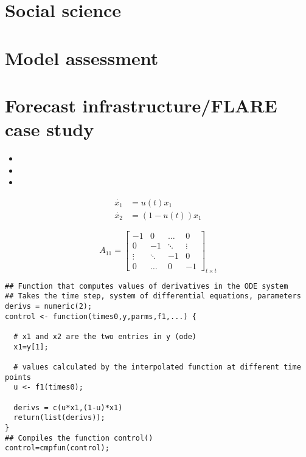 \documentclass[12pt, oneside]{article}   	%
\begin{document}
\section{Social science}

\section{Model assessment}

\section{Forecast infrastructure/FLARE case study}


\begin{itemize}
\item 

\item 

\item 

\end{itemize}

\begin{align}
\dot{x_1} & = u(t) x_1 \nonumber \\
\dot{x_2} & = (1-u(t)) x_1 
\end{align}

\begin{equation}
A_{11}=
  \begin{bmatrix}
    -1		& 0 	 	& \ldots 	& 0  	 \\
    0 	 	& -1  	& \ddots 	& \vdots  \\
    \vdots   & \ddots 	& -1		& 0  \\
    0 		& \ldots 	& 0 		& -1  
  \end{bmatrix}_{ t \times t}
\end{equation}

\begin{lstlisting}
## Function that computes values of derivatives in the ODE system
## Takes the time step, system of differential equations, parameters
derivs = numeric(2); 
control <- function(times0,y,parms,f1,...) {
  
  # x1 and x2 are the two entries in y (ode)
  x1=y[1]; 
  
  # values calculated by the interpolated function at different time points
  u <- f1(times0);
  
  derivs = c(u*x1,(1-u)*x1) 
  return(list(derivs));
}
## Compiles the function control()
control=cmpfun(control); 
\end{lstlisting}

\clearpage

\printindex

\clearpage
\nocite{*}

 

\end{document}
